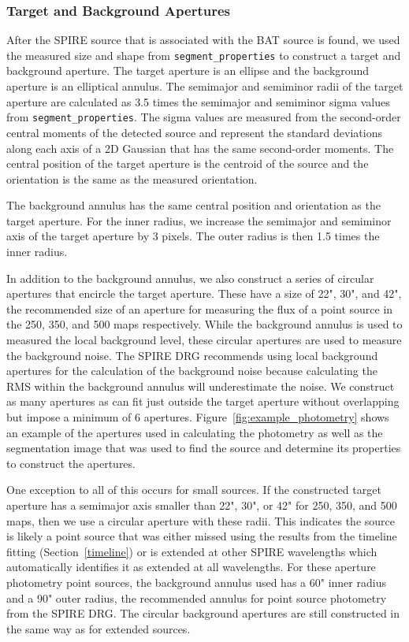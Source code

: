 \subsubsection{Target and Background Apertures}
After the SPIRE source that is associated with the BAT source is found, we used the measured size and shape from \texttt{segment_properties} to construct a target and background aperture. The target aperture is an ellipse and the background aperture is an elliptical annulus. The semimajor and semiminor radii of the target aperture are calculated as 3.5 times the semimajor and semiminor sigma values from \texttt{segment_properties}. The sigma values are measured from the second-order central moments of the detected source and represent the standard deviations along each axis of a 2D Gaussian that has the same second-order moments. The central position of the target aperture is the centroid of the source and the orientation is the same as the measured orientation.

The background annulus has the same central position and orientation as the target aperture. For the inner radius, we increase the semimajor and semiminor axis of the target aperture by 3 pixels. The outer radius is then 1.5 times the inner radius.

In addition to the background annulus, we also construct a series of circular apertures that encircle the target aperture. These have a size of 22", 30", and 42", the recommended size of an aperture for measuring the flux of a point source in the 250, 350, and 500 \um{} maps respectively. While the background annulus is used to measured the local background level, these circular apertures are used to measure the background noise. The SPIRE DRG recommends using local background apertures for the calculation of the background noise because calculating the RMS within the background annulus will underestimate the noise. We construct as many apertures as can fit just outside the target aperture without overlapping but impose a minimum of 6 apertures. Figure~\ref{fig:example_photometry} shows an example of the apertures used in calculating the photometry as well as the segmentation image that was used to find the source and determine its properties to construct the apertures. 

One exception to all of this occurs for small sources. If the constructed target aperture has a semimajor axis smaller than 22", 30", or 42" for 250, 350, and 500 \um{} maps, then we use a circular aperture with these radii. This indicates the source is likely a point source that was either missed using the results from the timeline fitting (Section~\ref{timeline}) or is extended at other SPIRE wavelengths which automatically identifies it as extended at all wavelengths. For these aperture photometry point sources, the background annulus used has a 60" inner radius and a 90" outer radius, the recommended annulus for point source photometry from the SPIRE DRG. The circular background apertures are still constructed in the same way as for extended sources.

